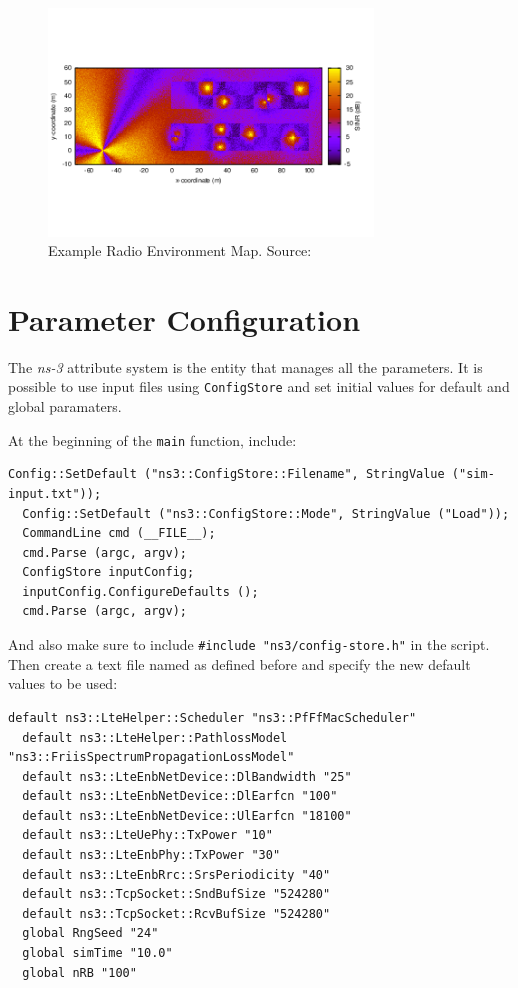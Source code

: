 \begin{figure}[h]
  \centering
  \includegraphics[width=0.77\textwidth]{img/rem.png}
  \caption{Example Radio Environment Map. Source:\cite{ns3} }
  \label{fig:rem}
\end{figure}

\section{Parameter Configuration}
The \textit{ns-3} attribute system is the entity that manages all the parameters. It is 
possible to use input files using \texttt{ConfigStore} and set initial values for default 
and global paramaters.

At the beginning of the \texttt{main} function, include:

\begin{lstlisting}[language=myC++, caption={Configuration parameters}, captionpos=b]
  Config::SetDefault ("ns3::ConfigStore::Filename", StringValue ("sim-input.txt"));
  Config::SetDefault ("ns3::ConfigStore::Mode", StringValue ("Load"));
  CommandLine cmd (__FILE__);
  cmd.Parse (argc, argv);
  ConfigStore inputConfig;
  inputConfig.ConfigureDefaults ();
  cmd.Parse (argc, argv);
\end{lstlisting}

And also make sure to include \texttt{\#include "ns3/config-store.h"} in the script. Then create
a text file named as defined before and specify the new default values to be used:

\begin{lstlisting}[language=myshell, caption={Configuration parameters}, captionpos=b]
  default ns3::LteHelper::Scheduler "ns3::PfFfMacScheduler"
  default ns3::LteHelper::PathlossModel "ns3::FriisSpectrumPropagationLossModel"
  default ns3::LteEnbNetDevice::DlBandwidth "25"
  default ns3::LteEnbNetDevice::DlEarfcn "100"
  default ns3::LteEnbNetDevice::UlEarfcn "18100"
  default ns3::LteUePhy::TxPower "10"
  default ns3::LteEnbPhy::TxPower "30"
  default ns3::LteEnbRrc::SrsPeriodicity "40"
  default ns3::TcpSocket::SndBufSize "524280"
  default ns3::TcpSocket::RcvBufSize "524280"
  global RngSeed "24"
  global simTime "10.0"
  global nRB "100"
\end{lstlisting}
